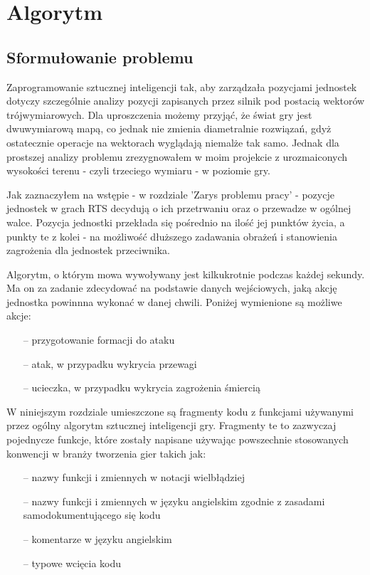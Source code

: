 \documentclass[12pt]{report}
\begin{document}
\chapter{Algorytm}
\section{Sformułowanie problemu}
Zaprogramowanie sztucznej inteligencji tak, aby zarządzała pozycjami jednostek dotyczy szczególnie analizy pozycji zapisanych przez silnik pod postacią wektorów trójwymiarowych. Dla uproszczenia możemy przyjąć, że świat gry jest dwuwymiarową mapą, co jednak nie zmienia diametralnie rozwiązań, gdyż ostatecznie operacje na wektorach wyglądają niemalże tak samo. Jednak dla prostszej analizy problemu zrezygnowałem w moim projekcie z urozmaiconych wysokości terenu - czyli trzeciego wymiaru - w poziomie gry.

Jak zaznaczyłem na wstępie - w rozdziale 'Zarys problemu pracy' - pozycje jednostek w grach RTS decydują o ich przetrwaniu oraz o przewadze w ogólnej walce. Pozycja jednostki przekłada się pośrednio na ilość jej punktów życia, a punkty te z kolei - na możliwość dłuższego zadawania obrażeń i stanowienia zagrożenia dla jednostek przeciwnika.

Algorytm, o którym mowa wywoływany jest kilkukrotnie podczas każdej sekundy. Ma on za zadanie zdecydować na podstawie danych wejściowych, jaką akcję jednostka powinnna wykonać w danej chwili. Poniżej wymienione są możliwe akcje:
\begin{itemize}
\item[--] przygotowanie formacji do ataku
\item[--] atak, w przypadku wykrycia przewagi
\item[--] ucieczka, w przypadku wykrycia zagrożenia śmiercią
\end{itemize}

W niniejszym rozdziale umieszczone są fragmenty kodu z funkcjami używanymi przez ogólny algorytm sztucznej inteligencji gry. Fragmenty te to zazwyczaj pojednycze funkcje, które zostały napisane używając powszechnie stosowanych konwencji w branży tworzenia gier takich jak:
\begin{itemize}
\item[--] nazwy funkcji i zmiennych w notacji wielbłądziej
\item[--] nazwy funkcji i zmiennych w języku angielskim zgodnie z zasadami samodokumentującego się kodu
\item[--] komentarze w języku angielskim
\item[--] typowe wcięcia kodu
\end{itemize}
\end{document}
